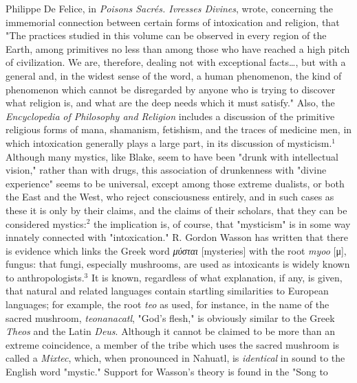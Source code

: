 {}

{}

Philippe De Felice, in \textit{Poisons Sacrés. Ivresses Divines},
wrote, concerning the immemorial connection between certain
forms of intoxication and religion, that "The practices
studied in this volume can be observed in every region of
the Earth, among primitives no less than among those who
have reached a high pitch of civilization. We are, therefore,
dealing not with exceptional facts\dots, but with a general
and, in the widest sense of the word, a human phenomenon, the
kind of phenomenon which cannot be disregarded by anyone who
is trying to discover what religion is, and what are the
deep needs which it must satisfy." Also, the \textit{Encyclopedia}
\textit{of Philosophy and Religion} includes a discussion of the
primitive religious forms of mana, shamanism, fetishism, and
the traces of medicine men, in which intoxication generally
plays a large part, in its discussion of mysticism.$^{1}$ Although
many mystics, like Blake, seem to have been "drunk with
intellectual vision," rather than with drugs, this association
of drunkenness with "divine experience" seems to be universal,
except among those extreme dualists, or both the East and the
West, who reject consciousness entirely, and in such cases as
these it is only by their claims, and the claims of their
scholars, that they can be considered mystics:$^{2}$ the implication
is, of course, that "mysticism" is in some way innately
connected with "intoxication." R. Gordon Wasson has written
that there is evidence which links the Greek word \textit{μύσται} [mysteries] with
the root \textit{myoo} [μ], fungus: that fungi, especially mushrooms, are
used as intoxicants is widely known to anthropologists.$^{3}$
It is known, regardless of what explanation, if any, is
given, that natural and related languages contain startling
similarities to European languages; for example, the root
\textit{teo} as used, for instance, in the name of the sacred mushroom,
\textit{teonanacatl}, "God's flesh," is obviously similar to the Greek
\textit{Theos} and the Latin \textit{Deus}. Although it cannot be claimed to
be more than an extreme coincidence, a member of the tribe
which uses the sacred mushroom is called a \textit{Mixtec}, which, when
pronounced in Nahuatl, is \textit{identical} in sound to the English
word "mystic." Support for Wasson's theory is found in the "Song to

